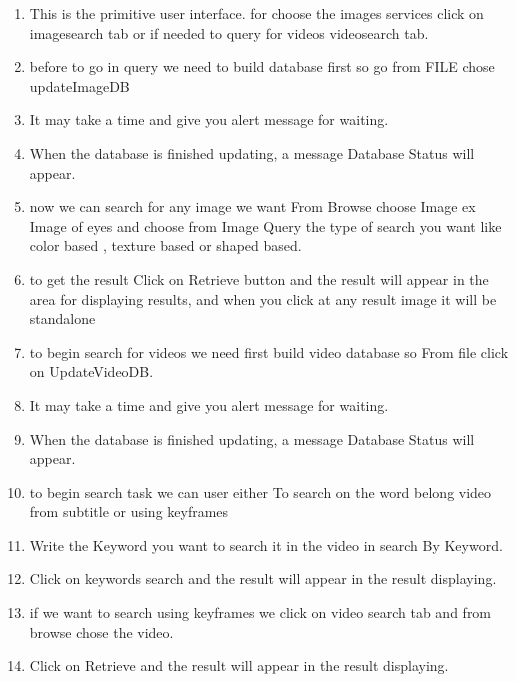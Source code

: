 \documentclass[pdftex,10pt,a4paper,oneside]{article}
\begin{document}
	\begin{enumerate}
		\item This is the primitive user interface.
		for choose the images services click on imagesearch tab or if needed to query for videos videosearch tab.
		
		
	\pagebreak
	\item before to go in query we need to build database first so go from FILE chose updateImageDB
			
	
		\item 	It may take a time and give you alert message for waiting.

	
	
	\pagebreak
			\item 	When the database is finished updating, a message Database Status will appear.
	
	
	
	
	
	
	
	
	
		\item now we can search for any image we want From Browse choose Image ex Image of eyes and choose from Image Query the type of search you want like color based , texture based or shaped based. 
		
		


\pagebreak
		\item 	to get the result Click on Retrieve button and the result will appear in the area for displaying results, and when you click at any result image it will be  standalone
	


	
	\item to begin search for videos we need first build video database
	so From file click on UpdateVideoDB.
		
		 
	
	
	\pagebreak
		\item 	It may take a time and give you alert message for waiting.
	
	
	
	
	\item 	When the database is finished updating, a message Database Status will appear.
	
\pagebreak
		\item to begin search task we can user either To search on the word belong video from subtitle or using keyframes 
	
	
	
		\item 	Write the Keyword you want to search it in the video in search By Keyword.
	

\pagebreak
		\item 	Click on keywords search and the result will appear in the result displaying.


		\item if we want to search using keyframes we click on video search tab and from browse chose the video.
			
		\pagebreak
				\item 	Click on Retrieve and the result will appear in the result displaying.
						
	\end{enumerate}
\pagebreak
\end{document}
